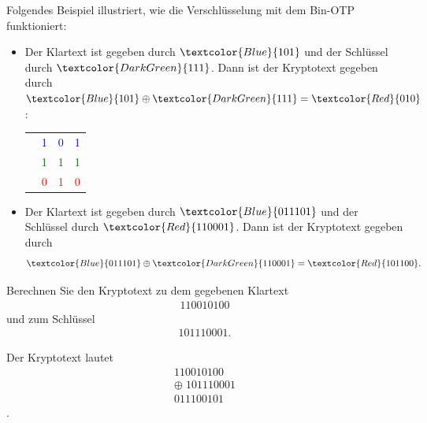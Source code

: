 \begin{myexample}Folgendes Beispiel illustriert, wie die Verschlüsselung mit dem Bin-\gls{OTP} funktioniert:
\begin{itemize}
	\item
	      Der Klartext ist gegeben durch $\textcolor{Blue}{101}$ und der Schlüssel durch $\textcolor{DarkGreen}{111}$. Dann ist der Kryptotext gegeben durch
	      $\textcolor{Blue}{101} \oplus \textcolor{DarkGreen}{111} = \textcolor{Red}{010}$:
	      \begin{center}
		      \begin{tabular}{cccc}
			             & \textcolor{Blue}{1}      & \textcolor{Blue}{0}      & \textcolor{Blue}{1}      \\
			      \oplus & \textcolor{DarkGreen}{1} & \textcolor{DarkGreen}{1} & \textcolor{DarkGreen}{1} \\
			      \hline
			             & \textcolor{Red}{0}       & \textcolor{Red}{1}       & \textcolor{Red}{0}
		      \end{tabular}
	      \end{center}
	\item
	      Der Klartext ist gegeben durch $\textcolor{Blue}{011101}$ und der Schlüssel durch $\textcolor{Red}{110001}$. Dann ist der Kryptotext gegeben durch
	      \begin{align*}
		      \textcolor{Blue}{011101} \oplus \textcolor{DarkGreen}{110001} = \textcolor{Red}{101100}.
	      \end{align*}
\end{itemize}
\end{myexample}

\begin{myexercise}
	Berechnen Sie den Kryptotext zu dem gegebenen Klartext
	\begin{align*}
		110010100
	\end{align*}
	und zum Schlüssel
	\begin{align*}
		101110001.
	\end{align*}
	\begin{myanswer}
		Der Kryptotext lautet
		\[
		\begin{array}{r}
		110010100\\
		\oplus\;101110001\\
		\hline
		011100101
		\end{array}
		\].
	\end{myanswer}
\end{myexercise}

